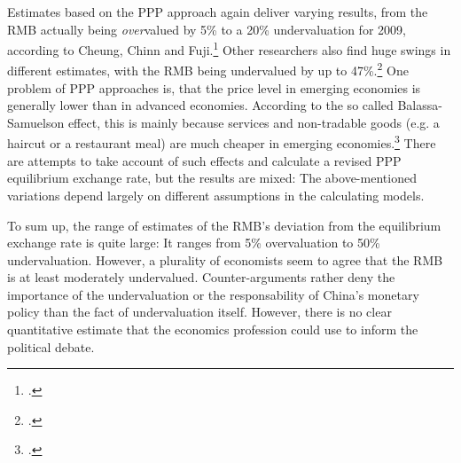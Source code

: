 Estimates based on the PPP approach again deliver varying results, from 
the RMB actually being \emph{over}valued by 5\% to a 20\% undervaluation 
for 2009, according to Cheung, Chinn and Fuji.\footnote{\cite[pp. 
82]{Cheung2010}.} Other researchers also find huge swings in different 
estimates, with the RMB being undervalued by up to 
47\%.\footnote{\cite[pp. 72]{Subramanian2010}.} One problem of PPP 
approaches is, that the price level in emerging economies is generally 
lower than in advanced economies. According to the so called 
Balassa-Samuelson effect, this is mainly because services and 
non-tradable goods (e.g. a haircut or a restaurant meal) are much 
cheaper in emerging economies.\footnote{\cite[pp. 57]{Frankel2010}.} 
There are attempts to take account of such effects and calculate a 
revised PPP equilibrium exchange rate, but the results are mixed: The 
above-mentioned variations depend largely on different assumptions in 
the calculating models.

To sum up, the range of estimates of the RMB's deviation from the 
equilibrium exchange rate is quite large: It ranges from 5\% 
overvaluation to 50\% undervaluation. However, a plurality of economists 
seem to agree that the RMB is at least moderately undervalued. 
Counter-arguments rather deny the importance of the undervaluation or 
the responsability of China's monetary policy than the fact of 
undervaluation itself. However, there is no clear quantitative estimate 
that the economics profession could use to inform the political debate.

